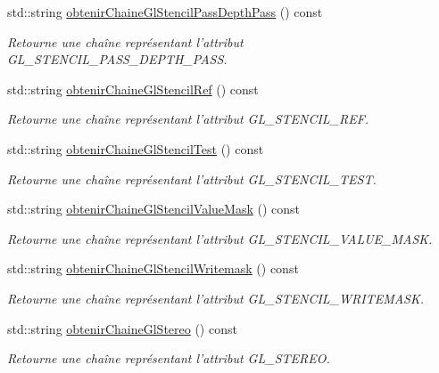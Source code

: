 \begin{DoxyCompactItemize}
std\-::string \hyperlink{group__utilitaire_ga722cf069559981c09c4b40810b37986f}{obtenir\-Chaine\-Gl\-Stencil\-Pass\-Depth\-Pass} () const 
\begin{DoxyCompactList}\small\item\em Retourne une chaîne représentant l'attribut G\-L\-\_\-\-S\-T\-E\-N\-C\-I\-L\-\_\-\-P\-A\-S\-S\-\_\-\-D\-E\-P\-T\-H\-\_\-\-P\-A\-S\-S. \end{DoxyCompactList}\item 
std\-::string \hyperlink{group__utilitaire_ga31c961d29726d9daaf4d7cfc78025a6b}{obtenir\-Chaine\-Gl\-Stencil\-Ref} () const 
\begin{DoxyCompactList}\small\item\em Retourne une chaîne représentant l'attribut G\-L\-\_\-\-S\-T\-E\-N\-C\-I\-L\-\_\-\-R\-E\-F. \end{DoxyCompactList}\item 
std\-::string \hyperlink{group__utilitaire_ga3c3fb4e59ed994063e62893114882ad7}{obtenir\-Chaine\-Gl\-Stencil\-Test} () const 
\begin{DoxyCompactList}\small\item\em Retourne une chaîne représentant l'attribut G\-L\-\_\-\-S\-T\-E\-N\-C\-I\-L\-\_\-\-T\-E\-S\-T. \end{DoxyCompactList}\item 
std\-::string \hyperlink{group__utilitaire_ga88f72c76847937fa57511a7758f43d43}{obtenir\-Chaine\-Gl\-Stencil\-Value\-Mask} () const 
\begin{DoxyCompactList}\small\item\em Retourne une chaîne représentant l'attribut G\-L\-\_\-\-S\-T\-E\-N\-C\-I\-L\-\_\-\-V\-A\-L\-U\-E\-\_\-\-M\-A\-S\-K. \end{DoxyCompactList}\item 
std\-::string \hyperlink{group__utilitaire_ga4dbeac5dc5d9ad85a54af632e3f96aac}{obtenir\-Chaine\-Gl\-Stencil\-Writemask} () const 
\begin{DoxyCompactList}\small\item\em Retourne une chaîne représentant l'attribut G\-L\-\_\-\-S\-T\-E\-N\-C\-I\-L\-\_\-\-W\-R\-I\-T\-E\-M\-A\-S\-K. \end{DoxyCompactList}\item 
std\-::string \hyperlink{group__utilitaire_gadb2e39bc8896bcdd38587b23347df156}{obtenir\-Chaine\-Gl\-Stereo} () const 
\begin{DoxyCompactList}\small\item\em Retourne une chaîne représentant l'attribut G\-L\-\_\-\-S\-T\-E\-R\-E\-O. \end{DoxyCompactList}\item 

\end{DoxyCompactItemize}
